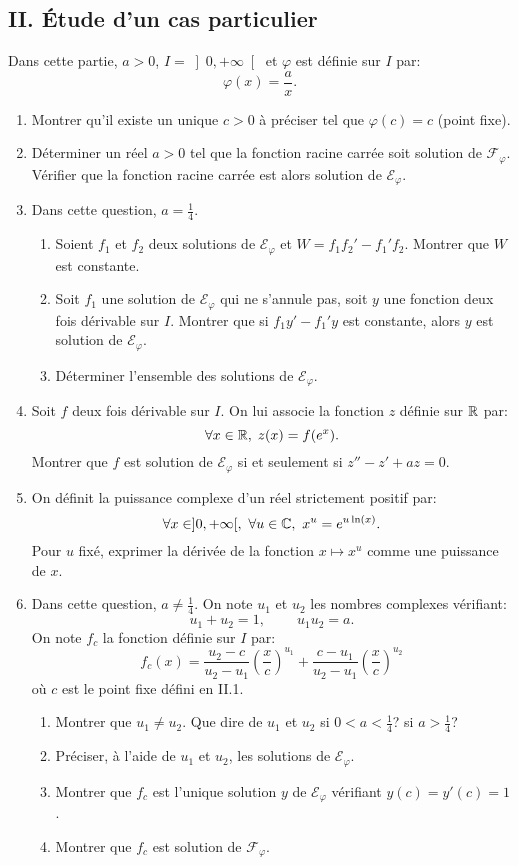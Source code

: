 \subsection*{II. \'Etude d'un cas particulier}

Dans cette partie, $a>0$, $I = \left]0, +\infty\right[$ et $\varphi$ est définie sur $I$ par:
\[ \varphi(x) = \frac{a}{x}.\]
\begin{enumerate}
 \item Montrer qu'il existe un unique $c>0$ à préciser tel que  $\varphi(c) = c$ (point fixe).
 \item Déterminer un réel $a>0$ tel que la fonction racine carrée soit solution de $\mathcal{F}_{\varphi}$. Vérifier que la fonction racine carrée est alors solution de $\mathcal{E}_{\varphi}$.
 \item Dans cette question, $a = \frac{1}{4}$.
 \begin{enumerate}
  \item Soient $f_{1}$ et $f_{2}$ deux solutions de $\mathcal{E}_{\varphi}$ et $W = f_{1}f_{2}' - f_{1}'f_{2}$. Montrer que $W$ est constante.
  \item Soit $f_{1}$ une solution de $\mathcal{E}_{\varphi}$ qui ne s'annule pas, soit $y$ une fonction deux fois dérivable sur $I$. Montrer que si $f_{1}y' - f_{1}'y$ est constante, alors $y$ est solution de $\mathcal{E}_{\varphi}$.
  \item Déterminer l'ensemble des solutions de $\mathcal{E}_{\varphi}$.
 \end{enumerate}
 \item Soit $f$ deux fois dérivable sur $I$. On lui associe la fonction $z$ définie sur $\mathbb{R}$ par: 
 \[ \forall x \in \mathbb{R}, \; z(x) = f(e^{x}).\]
 Montrer que $f$ est solution de $\mathcal{E}_{\varphi}$ si et seulement si $z'' - z' + az = 0$.
 \item On définit la puissance complexe d'un réel strictement positif par:
 \[ \forall x \in ]0, +\infty[,\ \forall u\in \mathbb{C},\ x^{u} = e^{u \ln (x)}.\]
 Pour $u$ fixé, exprimer la dérivée de la fonction $x\mapsto x^{u}$ comme une puissance de $x$.
 \item Dans cette question, $a\neq \frac{1}{4}$. On note $u_{1}$ et $u_{2}$ les nombres complexes vérifiant:
 \[ u_{1} + u_{2} = 1,\ \qquad u_{1}u_{2} = a.\]
   On note $f_{c}$ la fonction définie sur $I$ par:
  \[ f_{c}(x) = \frac{u_{2}-c}{u_{2}-u_{1}}\left ( \frac{x}{c}\right )^{u_{1}} + \frac{c-u_{1}}{u_{2}-u_{1}}\left ( \frac{x}{c}\right )^{u_{2}}\]
  où $c$ est le point fixe défini en II.1.
 \begin{enumerate}
  \item Montrer que $u_{1} \neq u_{2}$. Que dire de $u_{1}$ et $u_{2}$ si $0 < a < \frac{1}{4}$? si $a > \frac{1}{4}$?
  \item Préciser, à l'aide de $u_{1}$ et $u_{2}$, les solutions de $\mathcal{E}_{\varphi}$.
  \item Montrer que $f_{c}$ est l'unique solution $y$ de $\mathcal{E}_{\varphi}$ vérifiant $y(c) = y'(c) = 1$.
  \item Montrer que $f_{c}$ est solution de $\mathcal{F}_{\varphi}$.
 \end{enumerate}
\end{enumerate}


